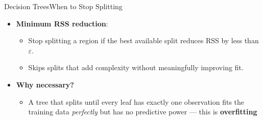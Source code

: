 \documentclass[hyperref={pdfpagelabels=false}]{beamer}
\begin{document}
\begin{frame}{Decision Trees}{When to Stop Splitting}

\begin{itemize}
  \item \textbf{Minimum RSS reduction}:
  \begin{itemize}
   \vspace{0.2cm}
   \item Stop splitting a region if the best available split reduces RSS by less than $\varepsilon$. 
     \vspace{0.2cm}
   \item  Skips splits that add complexity without meaningfully improving fit.
     \vspace{0.2cm}
\end{itemize}
\vspace{0.2cm}

  \item \textbf{Why necessary?} 
\vspace{0.2cm}

    \begin{itemize}  
  \item A tree that splits until every leaf has exactly one observation fits the training data \emph{perfectly} but has no predictive power --- this is \textbf{overfitting}

  \end{itemize}

\end{itemize}


\end{frame}
\end{document}
